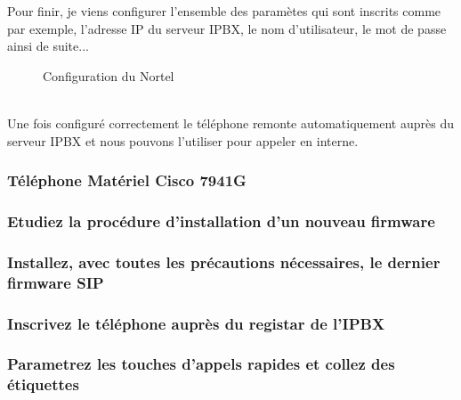\documentclass[12pt, a4paper]{article}
\begin{document}
	Pour finir, je viens configurer l'ensemble des paramètes qui sont inscrits
	comme par exemple, l'adresse IP du serveur IPBX, le nom d'utilisateur,
	le mot de passe ainsi de suite...\\
	\begin{figure}[h]
		\centering
		\caption{Configuration du Nortel}
		\label{fig:set}
	\end{figure}\\
	Une fois configuré correctement le téléphone remonte automatiquement auprès
	du serveur IPBX et nous pouvons l'utiliser pour appeler en interne. 


	\subsubsection{Téléphone Matériel Cisco 7941G}
	\subsubsection*{Etudiez la procédure d'installation d'un nouveau firmware}

	\subsubsection*{Installez, avec toutes les précautions nécessaires, le dernier firmware SIP}

	\subsubsection*{Inscrivez le téléphone auprès du registar de l'IPBX}
	
	\subsubsection*{Parametrez les touches d'appels rapides et collez des étiquettes}
\end{document}
